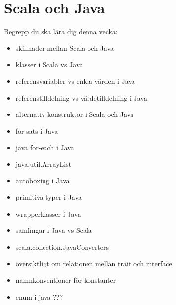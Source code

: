 \chapter{Scala och Java}\label{chapter:W11}
Begrepp du ska lära dig denna vecka:
\begin{multicols}{2}\begin{itemize}[nosep,label={$\square$},leftmargin=*]
\item skillnader mellan Scala och Java
\item klasser i Scala vs Java
\item referensvariabler vs enkla värden i Java
\item referenstilldelning vs värdetilldelning i Java
\item alternativ konstruktor i Scala och Java
\item for-sats i Java
\item java for-each i Java
\item java.util.ArrayList
\item autoboxing i Java
\item primitiva typer i Java
\item wrapperklasser i Java
\item samlingar i Java vs Scala
\item scala.collection.JavaConverters
\item översiktligt om relationen mellan trait och interface
\item namnkonventioner för konstanter
\item enum i java ???\end{itemize}\end{multicols}
